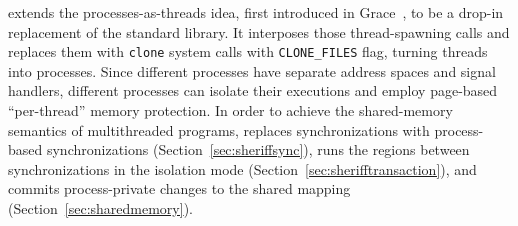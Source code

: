 \label{sec:sheriffframework}


%

\sheriff{} extends the processes-as-threads idea, first introduced in Grace~\cite{grace}, to be a drop-in replacement  of the standard \pthreads{} library. It interposes those thread-spawning calls and replaces them with \texttt{clone} system calls with \texttt{CLONE\_FILES} flag, turning threads into processes. Since different processes have separate address spaces and signal handlers, different processes can isolate their executions and employ page-based ``per-thread'' memory protection. In order to achieve the shared-memory semantics of multithreaded programs, \sheriff{} replaces synchronizations with process-based synchronizations (Section~\ref{sec:sheriffsync}), runs the regions between synchronizations in the isolation mode (Section~\ref{sec:sherifftransaction}), and commits process-private changes to the shared mapping (Section~\ref{sec:sharedmemory}). 

